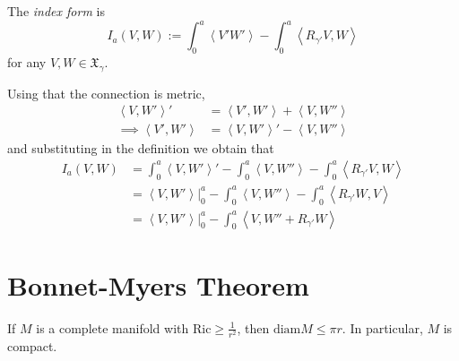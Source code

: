 \begin{definition}
\label{definition-index-form}
The {\it index form} is
\begin{equation}
\label{equation-index-form}
I_a(V,W):=\int_0^a
\left<V'W'\right>-\int_0^a\left<R_{\gamma'}V,W\right>
\end{equation}
for any $V,W \in \mathfrak{X}_\gamma$.
\end{definition}

\begin{remark}
\label{remark-index-form-alternative-formula}
Using that the connection is metric,
\begin{align*}
\left<V,W'\right>'&=\left<V',W'\right>+\left<V,W''\right>\\
\implies  \left<V',W'\right>&=\left<V,W'\right>'- \left<V,W''\right>
\end{align*}
and substituting in the definition we obtain that
\begin{equation}
\label{equation-index-form-alternative-formula}
\begin{aligned}
I_a(V,W)&=\int_0^a\left<V,W'\right>'-\int_0^a \left<V,W''\right>-\int_0^a \left<R_{\gamma'}V,W\right>\\
&=\left<V,W'\right>|_{0}^a-\int_0^a \left<V,W''\right>-\int_0^a\left<R_{\gamma'}W,V\right>\\
&=\left<V,W'\right>|_{0}^a-\int_0^a \left<V,W''+R_{\gamma'}W\right>
\end{aligned}
\end{equation}
\end{remark}

\section{Bonnet-Myers Theorem}
\label{section-Bonnet-Myers-theorem}

\begin{theorem}
\label{theorem-Bonnet-Myers}
If $M$ is a complete manifold with $\text{Ric} \geq \frac{1}{r^2}$, then
$\text{diam}M\leq \pi r$. In particular, $M$ is compact.
\end{theorem}

